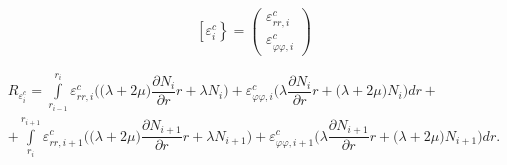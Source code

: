\documentclass[12pt,a4paper]{article}
\begin{document}
$$
\left[\varepsilon_{i}^{c}\right\}=\left(\begin{array}{l}
\varepsilon_{rr, i}^{c} \\
\varepsilon_{\varphi \varphi, i}^{c}
\end{array}\right)
$$

\begin{equation}
    \begin{gathered}
    R_{\varepsilon^c_i} = \int\limits_{r_{i-1}}^{r_{i}} \varepsilon_{rr, i}^c \Big(\big(\lambda+2 \mu\big) \dfrac{\partial N_i}{\partial r} r + \lambda N_i\Big) + 
    \varepsilon_{\varphi \varphi, i}^c \Big(\lambda \dfrac{\partial N_i}{\partial r} r + \big(\lambda+2 \mu\big) N_i\Big) dr + \\
    + \int\limits_{r_{i}}^{r_{i+1}} \varepsilon_{rr, i+1}^c \Big(\big(\lambda+2 \mu\big) \dfrac{\partial N_{i+1}}{\partial r} r + \lambda N_{i+1}\Big) + 
    \varepsilon_{\varphi \varphi, i+1}^c \Big(\lambda \dfrac{\partial N_{i+1}}{\partial r} r + \big(\lambda+2 \mu\big) N_{i+1}\Big) dr.
    \end{gathered}
\end{equation} 
\end{document}
